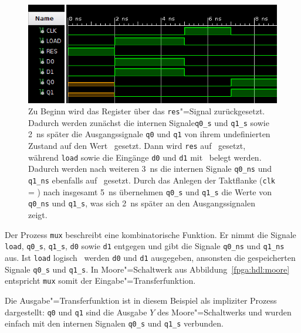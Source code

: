 \begin{figure}[htb]
    \centering
    \includegraphics[width=\textwidth]{reg2_waveform.png}
    \caption[Verhalten des 2-Bit-Registers]{Zu Beginn wird das Register über
             das \texttt{res}"=Signal zurückgesetzt. Dadurch werden zunächst die
             internen Signale\texttt{q0\_s} und \texttt{q1\_s} sowie
             \SI{2}{\nano\second} später die Ausgangssignale \texttt{q0} und
             \texttt{q1} von ihrem undefinierten Zustand auf den Wert
             \grqq\ gesetzt. Dann wird \texttt{res} auf \grqq\
             gesetzt, während \texttt{load} sowie die Eingänge \texttt{d0} und
             \texttt{d1} mit \glqq 1\grqq\ belegt werden. Dadurch werden nach
             weiteren \SI{3}{\nano\second} die internen Signale \texttt{q0\_ns}
             und \texttt{q1\_ns} ebenfalls auf \grqq\ gesetzt. Durch das
             Anlegen der Taktflanke (\texttt{clk} = \glqq 1\grqq) nach insgesamt
             \SI{5}{\nano\second} übernehmen \texttt{q0\_s} und \texttt{q1\_s}
             die Werte von \texttt{q0\_ns} und \texttt{q1\_s}, was sich
             \SI{2}{\nano\second} später an den Ausgangssignalen zeigt.}
    \label{fpga:hdl:waveform}
\end{figure}

Der Prozess \texttt{mux} beschreibt eine kombinatorische Funktion. Er
nimmt die Signale \texttt{load}, \texttt{q0\_s}, \texttt{q1\_s},
\texttt{d0} sowie \texttt{d1} entgegen und gibt die Signale \texttt{q0\_ns} und
\texttt{q1\_ns} aus. Ist \texttt{load} logisch \glqq 1\grqq\, werden \texttt{d0}
und \texttt{d1} ausgegeben, ansonsten die gespeicherten Signale \texttt{q0\_s}
und \texttt{q1\_s}. In Moore"=Schaltwerk aus Abbildung~\ref{fpga:hdl:moore}
entspricht \texttt{mux} somit der Eingabe"=Transferfunktion.
\cite[vgl.][31]{kesel2013}

Die Ausgabe"=Transferfunktion ist in diesem Beispiel als impliziter Prozess
dargestellt: \texttt{q0} und \texttt{q1} sind die Ausgabe $Y$ des
Moore"=Schaltwerks und wurden einfach mit den internen Signalen \texttt{q0\_s}
und \texttt{q1\_s} verbunden.
\cite[vgl.][31]{kesel2013}

